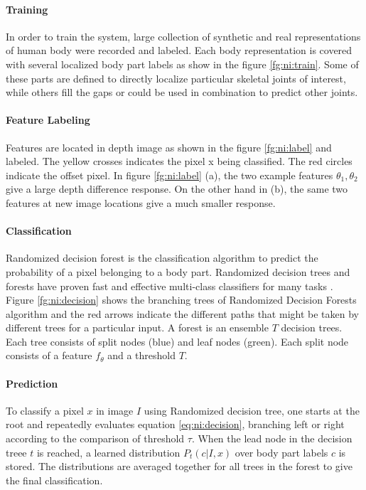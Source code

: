 

\paragraph*{Training} In order to train the system, large collection of synthetic and real representations of human body were recorded and labeled. Each body representation is covered with several localized body part labels as show in the figure \ref{fg:ni:train}. Some of these parts are defined to directly localize particular skeletal joints of interest, while others fill the gaps or could be used in combination to predict other joints.



\paragraph*{Feature Labeling} Features are located in depth image as shown in the figure \ref{fg:ni:label} and labeled. The yellow crosses indicates the pixel x being classified. The red circles indicate the offset pixel. In figure \ref{fg:ni:label} (a), the two example features $\theta_1, \theta_2$ give a large depth difference response. On the other hand in (b), the same two features at new image locations give a much smaller response.



\paragraph*{Classification} Randomized decision forest is the classification algorithm to predict the probability of a pixel belonging to a body part. Randomized decision trees and forests have proven fast and effective multi-class classifiers for many tasks \cite{13}. Figure \ref{fg:ni:decision} shows the branching trees of Randomized Decision Forests algorithm and the red arrows indicate the different paths that might be taken by different trees for a particular input. A forest is an ensemble $T$ decision trees. Each tree consists of split nodes (blue) and leaf nodes (green). Each split node consists of a feature $f_\theta$ and a threshold $T$. 



\paragraph*{Prediction} To classify a pixel $x$ in image $I$ using Randomized decision tree, one starts at the root and repeatedly evaluates equation \ref{eq:ni:decision}, branching left or right according to the comparison of threshold {$ \tau$}. When the lead node in the decision treee $t$ is reached, a learned distribution $ P_t(c|I,x) $ over body part labels $c$ is stored. The distributions are averaged together for all trees in the forest to give the final classification.

